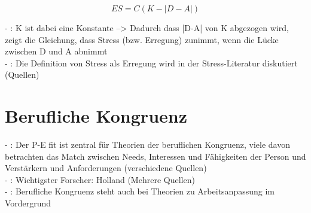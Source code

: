 \begin{equation}
	ES = C(K-|D-A|)
	\label{fig:formel3}
\end{equation}

- \cite[S. 17]{edwards:2008}: K ist dabei eine Konstante --> Dadurch dass |D-A| von K abgezogen wird, zeigt die Gleichung, dass Stress (bzw. Erregung) zunimmt, wenn die Lücke zwischen D und A abnimmt \\
- \cite[S. 18]{edwards:2008}: Die Definition von Stress als Erregung wird in der Stress-Literatur diskutiert (Quellen)

\section{Berufliche Kongruenz}
\label{ch:notizen:beruflicheKongruenz}
- \cite[S. 25]{edwards:2008}: Der P-E fit ist zentral für Theorien der beruflichen Kongruenz, viele davon betrachten das Match zwischen Needs, Interessen und Fähigkeiten der Person und Verstärkern und Anforderungen (verschiedene Quellen) \\
- \cite[S. 26]{edwards:2008}: Wichtigster Forscher: Holland (Mehrere Quellen) \\
- \cite[S. 26]{edwards:2008}: Berufliche Kongruenz steht auch bei Theorien zu Arbeitsanpassung im Vordergrund

